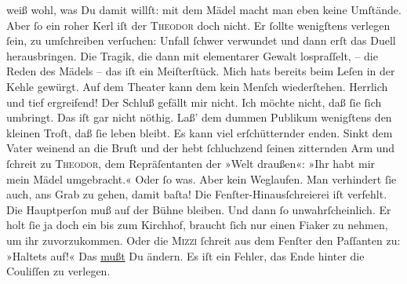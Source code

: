                weiß wohl, was Du damit willſt: mit {\pb}dem Mädel macht
               man eben keine Umſtände. Aber{ }ſo ein roher Kerl iſt der \textsc{Theodor} doch nicht. Er{ }ſollte wenigſtens verlegen{ }ſein, zu umſchreiben verſuchen:
               Unfall {\dotsfour}{ }ſchwer verwundet {\dotsfour} und
                   dann erſt das Duell herausbringen. Die Tragik,
               die dann mit elementarer Gewalt lospraſſelt, – die Reden des Mädels – das iſt ein Meiſterſtück. Mich hats bereits
               beim Leſen in der Kehle gewürgt. Auf dem Theater kann dem kein Menſch wiederſtehen.
               Herrlich und tief ergreifend! Der Schluß gefällt mir nicht. Ich möchte nicht, daß{ }ſie{ }ſich umbringt. Das iſt
                  {\pb}gar nicht nöthig. Laß’ dem dummen Publikum
               wenigſtens den kleinen Troſt, daß{ }ſie leben bleibt. Es kann viel erſchütternder
               enden. Sinkt dem Vater weinend an die Bruſt und der hebt{ }ſchluchzend{ }ſeinen
               zitternden Arm und{ }ſchreit zu \textsc{Theodor}, dem Repräſentanten der »Welt draußen«: »Ihr habt mir mein Mädel umgebracht.«
               Oder{ }ſo was. Aber kein Weglaufen. Man verhindert ſie auch, ans Grab zu gehen, damit baſta! Die Fenſter-Hinausſchreierei iſt
               verfehlt. Die Hauptperſon muß
               auf der Bühne bleiben. Und dann{ }ſo unwahrſcheinlich. {\pb}Er holt{ }ſie ja doch ein\strikeout{;} bis zum Kirchhof, braucht{ }ſich nur einen Fiaker zu nehmen, um ihr zuvorzukommen. Oder die \textsc{Mizzi}{ }ſchreit aus dem Fenſter den Paſſanten zu: »Haltets auf!« Das \uline{mußt} Du ändern. Es iſt ein Fehler, das Ende hinter die
               Couliſſen zu verlegen.\pend
           

